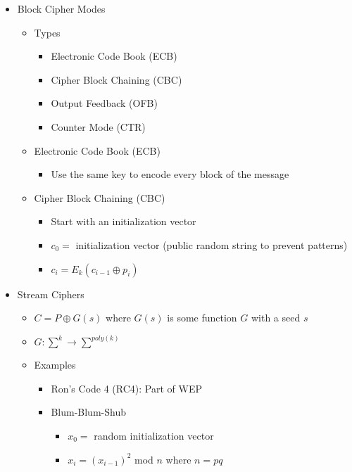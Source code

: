 \begin{itemize}
\begin{itemize}
\begin{itemize}
        \end{itemize}
    \end{itemize}
\item Block Cipher Modes
    \begin{itemize}
    \item Types
        \begin{itemize}
        \item Electronic Code Book (ECB)
        \item Cipher Block Chaining (CBC)
        \item Output Feedback (OFB)
        \item Counter Mode (CTR)
        \end{itemize}
    \item Electronic Code Book (ECB)
        \begin{itemize}
        \item Use the same key to encode every block of the message
        \end{itemize}
    \item Cipher Block Chaining (CBC)
        \begin{itemize}
        \item Start with an initialization vector
        \item $c_0 =$ initialization vector (public random string to prevent patterns)
        \item $c_i = E_k(c_{i-1} \oplus p_i)$
        \end{itemize}
    \end{itemize}
\item Stream Ciphers
    \begin{itemize}
    \item $C = P \oplus G(s)$ where $G(s)$ is some function $G$ with a seed $s$
    \item $G: \sum^k\rightarrow \sum^{poly(k)}$
    \item Examples
        \begin{itemize}
        \item Ron's Code 4 (RC4): Part of WEP
        \item Blum-Blum-Shub
            \begin{itemize}
            \item $x_0 = $ random initialization vector
            \item $x_i = (x_{i-1})^2$ mod $n$ where $n=pq$
            \end{itemize}
        \end{itemize}
    \end{itemize}
\end{itemize}
